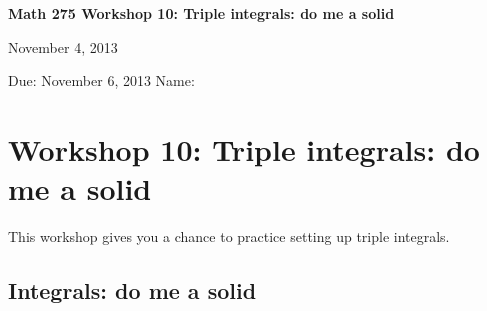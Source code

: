 \documentclass[12pt]{exam}
\theoremstyle{definition}
\begin{document}
\noindent
\textbf{{\large Math 275 \hfill Workshop 10: Triple integrals: do me a solid}}

\noindent
November 4, 2013 

\noindent
Due: November 6, 2013 \hfill Name: \underline{\hspace{3in}} 

\noindent

\section{Workshop 10: Triple integrals: do me a solid}

This workshop gives you a chance to practice setting up triple
integrals.

\subsection{Integrals: do me a solid}
\end{document}
